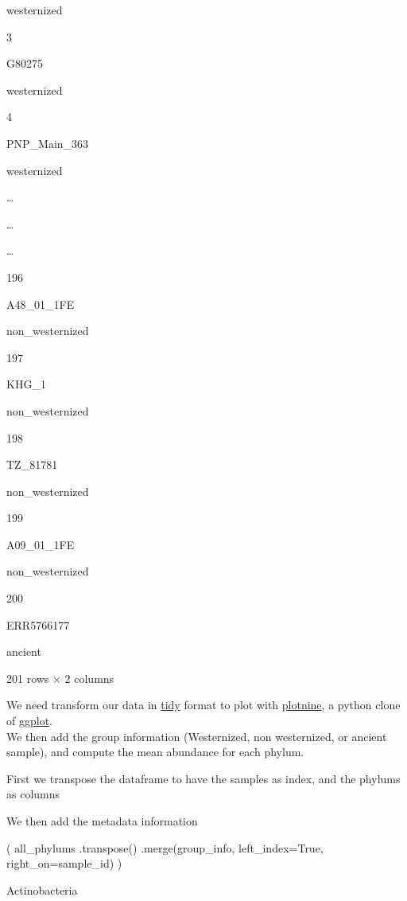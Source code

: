\documentclass[
  letterpaper,
]{book}
\newenvironment{Shaded}{}{}
\newcommand{\NormalTok}[1]{\textcolor[rgb]{0.14,0.16,0.18}{#1}}
\newcommand{\OperatorTok}[1]{\textcolor[rgb]{0.14,0.16,0.18}{#1}}
\newcommand{\StringTok}[1]{\textcolor[rgb]{0.01,0.18,0.38}{#1}}
\newcommand{\VariableTok}[1]{\textcolor[rgb]{0.89,0.38,0.04}{#1}}
\begin{document}
westernized

3

G80275

westernized

4

PNP\_Main\_363

westernized

\ldots{}

\ldots{}

\ldots{}

196

A48\_01\_1FE

non\_westernized

197

KHG\_1

non\_westernized

198

TZ\_81781

non\_westernized

199

A09\_01\_1FE

non\_westernized

200

ERR5766177

ancient

201 rows × 2 columns

We need transform our data in
\href{https://cran.r-project.org/web/packages/tidyr/vignettes/tidy-data.html}{tidy}
format to plot with
\href{https://plotnine.readthedocs.io/en/stable/}{plotnine}, a python
clone of \href{https://ggplot2.tidyverse.org/index.html}{ggplot}.\\
We then add the group information (Westernized, non westernized, or
ancient sample), and compute the mean abundance for each phylum.

First we transpose the dataframe to have the samples as index, and the
phylums as columns

We then add the metadata information

\begin{Shaded}
\begin{Highlighting}[]
\NormalTok{(}
\NormalTok{    all\_phylums}
\NormalTok{    .transpose()}
\NormalTok{    .merge(group\_info, left\_index}\OperatorTok{=}\VariableTok{True}\NormalTok{, right\_on}\OperatorTok{=}\StringTok{\textquotesingle{}sample\_id\textquotesingle{}}\NormalTok{)}
\NormalTok{)}
\end{Highlighting}
\end{Shaded}

Actinobacteria
\end{document}

